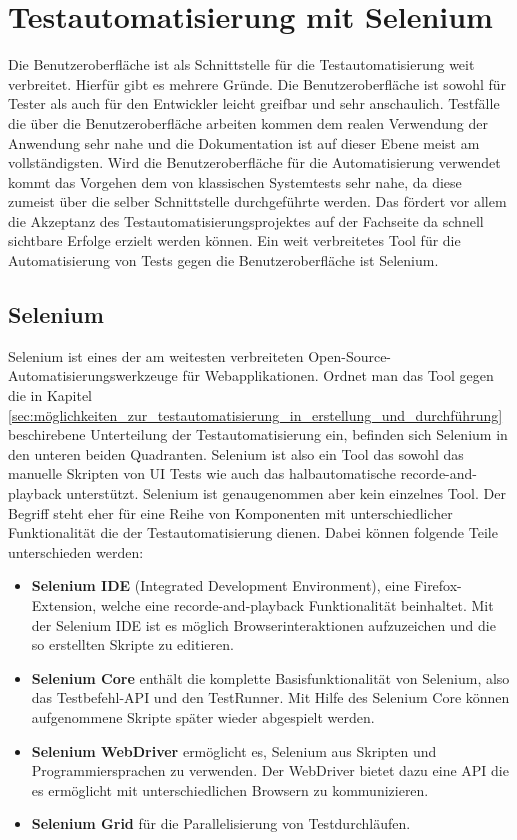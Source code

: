 \chapter{Testautomatisierung mit Selenium}
\label{sec:testautomatisierung_mit_selenium}
Die Benutzeroberfläche ist als Schnittstelle für die Testautomatisierung weit verbreitet. Hierfür gibt es mehrere Gründe. Die Benutzeroberfläche ist sowohl für Tester als auch für den Entwickler leicht greifbar und sehr anschaulich. Testfälle die über die Benutzeroberfläche arbeiten kommen dem realen Verwendung der Anwendung sehr nahe und die Dokumentation ist auf dieser Ebene meist am vollständigsten. Wird die Benutzeroberfläche für die Automatisierung verwendet kommt das Vorgehen dem von klassischen Systemtests sehr nahe, da diese zumeist über die selber Schnittstelle durchgeführte werden. \cite[vgl. Seite 48]{seidl_basiswissen_2012} Das fördert vor allem die Akzeptanz des Testautomatisierungsprojektes auf der Fachseite da schnell sichtbare Erfolge erzielt werden können. 
Ein weit verbreitetes Tool für die Automatisierung von Tests gegen die Benutzeroberfläche ist Selenium.

\section{Selenium}
\label{sec:selenium}
Selenium \cite{selenium_selenium_????} ist eines der am weitesten verbreiteten Open-Source-Automatisierungswerkzeuge für Webapplikationen. Ordnet man das Tool gegen die in Kapitel \ref{sec:möglichkeiten_zur_testautomatisierung_in_erstellung_und_durchführung} beschirebene Unterteilung der Testautomatisierung ein, befinden sich Selenium in den unteren beiden Quadranten.
Selenium ist also ein Tool das sowohl das manuelle Skripten von UI Tests wie auch das halbautomatische recorde-and-playback unterstützt. Selenium ist genaugenommen aber kein einzelnes Tool. Der Begriff steht eher für eine Reihe von Komponenten mit unterschiedlicher Funktionalität die der Testautomatisierung dienen. Dabei können folgende Teile unterschieden werden:

\begin{itemize}
	  \itemsep0pt
      \item \textbf{Selenium IDE} (Integrated Development Environment), eine Firefox-Extension, welche eine recorde-and-playback Funktionalität beinhaltet. Mit der Selenium IDE ist es möglich Browserinteraktionen aufzuzeichen und die so erstellten Skripte zu editieren.
      \item \textbf{Selenium Core} enthält die komplette Basisfunktionalität von Selenium, also das Testbefehl-API und den TestRunner. Mit Hilfe des Selenium Core können aufgenommene Skripte später wieder abgespielt werden.
      \item \textbf{Selenium WebDriver} ermöglicht es, Selenium aus Skripten und Programmiersprachen zu verwenden. Der WebDriver bietet dazu eine API die es ermöglicht mit unterschiedlichen Browsern zu kommunizieren.
      \item \textbf{Selenium Grid} für die Parallelisierung von Testdurchläufen.     
\end{itemize}


